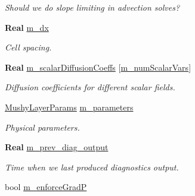 \begin{DoxyCompactItemize}
\begin{DoxyCompactList}\small\item\em Should we do slope limiting in advection solves? \end{DoxyCompactList}\item 
\mbox{\label{class_a_m_r_level_mushy_layer_a6e8ce82a43920d2e8bcca5aab6b4ac5e}} 
\textbf{ Real} \hyperlink{class_a_m_r_level_mushy_layer_a6e8ce82a43920d2e8bcca5aab6b4ac5e}{m\+\_\+dx}
\begin{DoxyCompactList}\small\item\em Cell spacing. \end{DoxyCompactList}\item 
\mbox{\label{class_a_m_r_level_mushy_layer_afb12e6063552f8629a5d81fbac6ac20b}} 
\textbf{ Real} \hyperlink{class_a_m_r_level_mushy_layer_afb12e6063552f8629a5d81fbac6ac20b}{m\+\_\+scalar\+Diffusion\+Coeffs} \mbox{[}\hyperlink{mushy_layer_opt_8h_afcada9fb65a998951da882b5c10191fea83db32f5839575c9d7812f3cd0727d07}{m\+\_\+num\+Scalar\+Vars}\mbox{]}
\begin{DoxyCompactList}\small\item\em Diffusion coefficients for different scalar fields. \end{DoxyCompactList}\item 
\mbox{\label{class_a_m_r_level_mushy_layer_abe361484bd04d3be84f4c3a0c96d896d}} 
\hyperlink{class_mushy_layer_params}{Mushy\+Layer\+Params} \hyperlink{class_a_m_r_level_mushy_layer_abe361484bd04d3be84f4c3a0c96d896d}{m\+\_\+parameters}
\begin{DoxyCompactList}\small\item\em Physical parameters. \end{DoxyCompactList}\item 
\mbox{\label{class_a_m_r_level_mushy_layer_ac8b6ab9b6a0ad4593c013fd10700e5a6}} 
\textbf{ Real} \hyperlink{class_a_m_r_level_mushy_layer_ac8b6ab9b6a0ad4593c013fd10700e5a6}{m\+\_\+prev\+\_\+diag\+\_\+output}
\begin{DoxyCompactList}\small\item\em Time when we last produced diagnostics output. \end{DoxyCompactList}\item 
bool \hyperlink{class_a_m_r_level_mushy_layer_a731a16b4dfaecb9235357b88e251af97}{m\+\_\+enforce\+GradP}

\end{DoxyCompactItemize}
